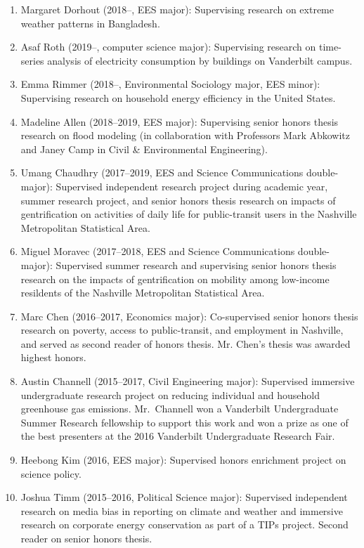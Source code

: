 \documentclass[10pt]{article}
\begin{document}
	\begin{enumerate}
    \item Margaret Dorhout (2018--, EES major): Supervising research on extreme weather patterns in Bangladesh.
    \item Asaf Roth (2019--, computer science major): Supervising research on time-series analysis of electricity consumption by buildings on Vanderbilt campus.
    \item Emma Rimmer (2018--, Environmental Sociology major, EES minor): Supervising research on household energy efficiency in the United States.
    \item Madeline Allen (2018--2019, EES major): Supervising senior honors thesis research on flood modeling (in collaboration with Professors Mark Abkowitz and Janey Camp in Civil \& Environmental Engineering).
	\item Umang Chaudhry (2017--2019, EES and Science Communications double-major): Supervised independent research project during academic year, summer research project, and senior honors thesis research on impacts of gentrification on activities of daily life
	for public-transit users in the Nashville Metropolitan Statistical Area.
    \item Miguel Moravec (2017--2018, EES and Science Communications double-major): Supervised summer research and supervising senior honors thesis research on the impacts of gentrification on mobility among low-income resildents of the Nashville Metropolitan Statistical Area.
    \item Marc Chen (2016--2017, Economics major): Co-supervised senior honors thesis research on poverty, access to public-transit, and employment in Nashville, and served as second reader of honors thesis. Mr. Chen's thesis was awarded highest honors.
    \item Austin Channell (2015--2017, Civil Engineering major): Supervised immersive undergraduate research project on reducing individual and household greenhouse gas emissions.
    Mr.~Channell won a Vanderbilt Undergraduate Summer Research fellowship to support this work and won a prize as one of the best presenters at the 2016 Vanderbilt Undergraduate Research Fair.
    \item Heebong Kim (2016, EES major): Supervised honors enrichment project on science policy.
	\item Joshua Timm (2015--2016, Political Science major): Supervised independent research on media bias in reporting on climate and weather and immersive research on corporate energy conservation as part of a TIPs project. Second reader on senior honors thesis.

\end{enumerate}
\end{document}
